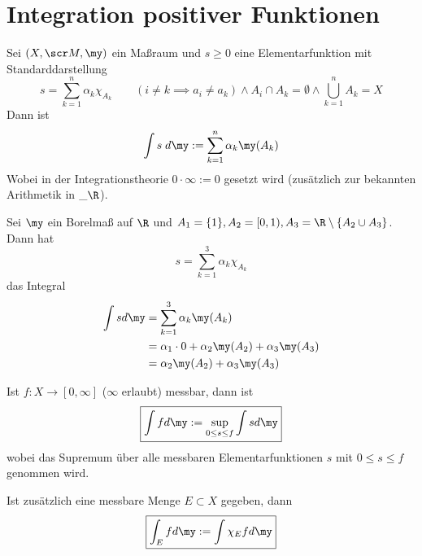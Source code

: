 \documentclass{mycourse}
\begin{document}
\section{Integration positiver Funktionen}

\begin{df*}
	Sei $(X,\scr M, \my)$ ein Maßraum und $s\ge 0$ eine Elementarfunktion mit Standarddarstellung
	\[
		s=\sum_{k=1}^n \alpha_k \chi_{A_k} \qquad (i\neq k \implies a_i\neq a_k) \land A_i\cap A_k =\emptyset \land \bigcup_{k=1}^nA_k = X
	\]
	Dann ist
	\[
		\int s\;d\my := \sum_{k=1}^n \alpha_k \my(A_k)
	\]
	Wobei in der Integrationstheorie $0\cdot \infty := 0$ gesetzt wird (zusätzlich zur bekannten Arithmetik in $\_\R$).
\end{df*}


\begin{ex*}
	Sei $\my$ ein Borelmaß auf $\R$ und $A_1 = \{1\}, A_2 = [0,1), A_3 = \R\setminus \{A_2\cup A_3\}$.
	Dann hat
	\[
		s= \sum_{k=1}^3 \alpha_k \chi_{A_k}
	\]
	das Integral
	\begin{align*}
		\int s d\my &= \sum_{k=1}^3 \alpha_k \my(A_k)\\
											   &= \alpha_1\cdot 0  + \alpha_2 \my(A_2) + \alpha_3 \my(A_3)\\
										 &= \alpha_2\my(A_2) + \alpha_3 \my(A_3)
	\end{align*}
\end{ex*}

\begin{df*}
	Ist $f:X\to [0,\infty]$ ($\infty$ erlaubt) messbar, dann ist
	\[\boxed{
		\int f d\my := \sup_{0\le s\le f} \int s d\my
	}\]
	wobei das Supremum über alle messbaren Elementarfunktionen $s$ mit $0\le s\le f$ genommen wird.

	Ist zusätzlich eine messbare Menge $E\subset X$ gegeben, dann
	\[\boxed{
		\int_E f d\my := \int \chi_E f d\my
	}\]
\end{df*}
\end{document}
